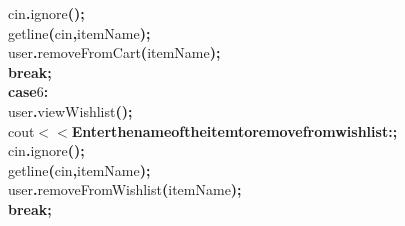 \documentclass[a4paper, 17pt]{article}
\newcommand\SPC{\hspace*{0.6em}}
\newcommand\QOT{\mbox{\char 34}}
\newcommand{\CppAIdentifier}[1]{#1}
\newcommand{\CppANumber}[1]{\textcolor[rgb]{0.5,0,0.5}{#1}}
\newcommand{\CppAReservedWord}[1]{\textbf{#1}}
\newcommand{\CppASpace}[1]{\colorbox[rgb]{1,1,1}{#1}}
\newcommand{\CppAString}[1]{\textbf{\textcolor[rgb]{0,0,1}{#1}}}
\newcommand{\CppASymbol}[1]{\textbf{\textcolor[rgb]{1,0,0}{#1}}}
\begin{document}
\begin{ttfamily}
\CppASpace{\SPC \SPC \SPC \SPC \SPC \SPC \SPC \SPC \SPC \SPC \SPC \SPC \SPC \SPC \SPC \SPC }\CppAIdentifier{cin}\CppASymbol{.}\CppAIdentifier{ignore}\CppASymbol{(}\CppASymbol{)}\CppASymbol{;}\\
\CppASpace{\SPC \SPC \SPC \SPC \SPC \SPC \SPC \SPC \SPC \SPC \SPC \SPC \SPC \SPC \SPC \SPC }\CppAIdentifier{getline}\CppASymbol{(}\CppAIdentifier{cin}\CppASymbol{,}\CppASpace{\SPC }\CppAIdentifier{itemName}\CppASymbol{)}\CppASymbol{;}\\
\CppASpace{\SPC \SPC \SPC \SPC \SPC \SPC \SPC \SPC \SPC \SPC \SPC \SPC \SPC \SPC \SPC \SPC }\CppAIdentifier{user}\CppASymbol{.}\CppAIdentifier{removeFromCart}\CppASymbol{(}\CppAIdentifier{itemName}\CppASymbol{)}\CppASymbol{;}\\
\CppASpace{\SPC \SPC \SPC \SPC \SPC \SPC \SPC \SPC \SPC \SPC \SPC \SPC \SPC \SPC \SPC \SPC }\CppAReservedWord{break}\CppASymbol{;}\\
\CppASpace{\SPC \SPC \SPC \SPC \SPC \SPC \SPC \SPC \SPC \SPC \SPC \SPC }\CppAReservedWord{case}\CppASpace{\SPC }\CppANumber{6}\CppASymbol{:}\\
\CppASpace{\SPC \SPC \SPC \SPC \SPC \SPC \SPC \SPC \SPC \SPC \SPC \SPC \SPC \SPC \SPC \SPC }\CppAIdentifier{user}\CppASymbol{.}\CppAIdentifier{viewWishlist}\CppASymbol{(}\CppASymbol{)}\CppASymbol{;}\\
\CppASpace{\SPC \SPC \SPC \SPC \SPC \SPC \SPC \SPC \SPC \SPC \SPC \SPC \SPC \SPC \SPC \SPC }\CppAIdentifier{cout}\CppASpace{\SPC }\CppASymbol{$<$$<$}\CppASpace{\SPC }\CppAString{\QOT Enter\SPC the\SPC name\SPC of\SPC the\SPC item\SPC to\SPC remove\SPC from\SPC wishlist:\SPC \QOT }\CppASymbol{;}\\
\CppASpace{\SPC \SPC \SPC \SPC \SPC \SPC \SPC \SPC \SPC \SPC \SPC \SPC \SPC \SPC \SPC \SPC }\CppAIdentifier{cin}\CppASymbol{.}\CppAIdentifier{ignore}\CppASymbol{(}\CppASymbol{)}\CppASymbol{;}\\
\CppASpace{\SPC \SPC \SPC \SPC \SPC \SPC \SPC \SPC \SPC \SPC \SPC \SPC \SPC \SPC \SPC \SPC }\CppAIdentifier{getline}\CppASymbol{(}\CppAIdentifier{cin}\CppASymbol{,}\CppASpace{\SPC }\CppAIdentifier{itemName}\CppASymbol{)}\CppASymbol{;}\\
\CppASpace{\SPC \SPC \SPC \SPC \SPC \SPC \SPC \SPC \SPC \SPC \SPC \SPC \SPC \SPC \SPC \SPC }\CppAIdentifier{user}\CppASymbol{.}\CppAIdentifier{removeFromWishlist}\CppASymbol{(}\CppAIdentifier{itemName}\CppASymbol{)}\CppASymbol{;}\\
\CppASpace{\SPC \SPC \SPC \SPC \SPC \SPC \SPC \SPC \SPC \SPC \SPC \SPC \SPC \SPC \SPC \SPC }\CppAReservedWord{break}\CppASymbol{;}\\

\end{ttfamily}
\end{document}
